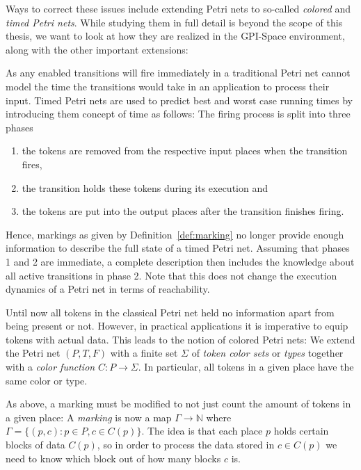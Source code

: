 \documentclass[
  paper=a4,
  titlepage,
  bibliography=totoc,
  listof=totoc,
  pagesize=pdftex
]{scrartcl}
\numberwithin{figure}{section}
\numberwithin{equation}{section}
\numberwithin{table}{section}
\newcommand*\setN{\mathds{N}}
\theoremstyle{definition}
\numberwithin{definition}{section}
\begin{document}
Ways to correct these issues include extending Petri nets to so-called
\emph{colored} and \emph{timed Petri nets}. While studying them in full detail is beyond
the scope of this thesis, we want to look at how they are realized in the GPI-Space
environment, along with the other important extensions: %
\begin{description}[leftmargin=\parindent]
  \item[Time:] As any enabled transitions will fire immediately in a traditional Petri
    net cannot model the time the transitions would take in an application to process
    their input. Timed Petri nets are used to predict best and worst case running times by
    introducing them concept of time as follows: The firing process is split into three
    phases
    \begin{enumerate}[label=\arabic*.]
      \item the tokens are removed from the respective input places when the transition
        fires,
      \item the transition holds these tokens during its execution and
      \item the tokens are put into the output places after the transition finishes
        firing.
    \end{enumerate}
    Hence, markings as given by Definition~\ref{def:marking} no longer provide enough
    information to describe the full state of a timed Petri net. Assuming that phases 1
    and 2 are immediate, a complete description then includes the knowledge about all
    active transitions in phase 2. Note that this does not change the execution dynamics
    of a Petri net in terms of reachability. %
  \item[Types and Type Safety:] Until now all tokens in the classical Petri net held no
    information apart from being present or not. However, in practical applications it is
    imperative to equip tokens with actual data. This leads to the notion of colored Petri
    nets: We extend the Petri net $(P,T,F)$ with a finite set $\Sigma$ of \emph{token
    color sets} or \emph{types} together with a \emph{color function} $C:P\to\Sigma$. In
    particular, all tokens in a given place have the same color or type.

    As above, a marking must be modified to not just count the amount of tokens in a given
    place: A \emph{marking} is now a map $\Gamma \to \setN$ where $\Gamma = \{ (p,c) : p
    \in P, c \in C(p) \}$. The idea is that each place $p$ holds certain blocks of data
    $C(p)$, so in order to process the data stored in $c \in C(p)$ we need to know which
    block out of how many blocks $c$ is.


\end{description}
\end{document}

